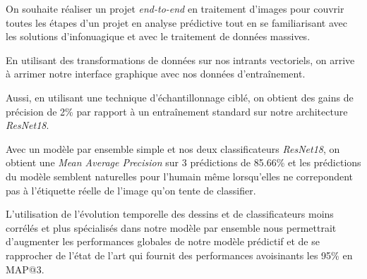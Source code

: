 On souhaite réaliser un projet \emph{end-to-end} en traitement d'images pour couvrir toutes les étapes d'un projet en analyse prédictive tout en se familiarisant avec les solutions d'infonuagique et avec le traitement de données massives.

En utilisant des transformations de données sur nos intrants vectoriels, on arrive à arrimer notre interface graphique avec nos données d'entraînement. 

Aussi, en utilisant une technique d'échantillonnage ciblé, on obtient des gains de précision de 2\% par rapport à un entraînement standard sur notre architecture \emph{ResNet18}. 

Avec un modèle par ensemble simple et nos deux classificateurs \emph{ResNet18}, on obtient une \emph{Mean Average Precision} sur 3 prédictions de 85.66\% et les prédictions du modèle semblent naturelles pour l'humain même lorsqu'elles ne correpondent pas à l'étiquette réelle de l'image qu'on tente de classifier.

L'utilisation de l'évolution temporelle des dessins et de classificateurs moins corrélés et plus spécialisés dans notre modèle par ensemble nous permettrait d'augmenter les performances globales de notre modèle prédictif et de se rapprocher de l'état de l'art qui fournit des performances avoisinants les 95\% en MAP@3.